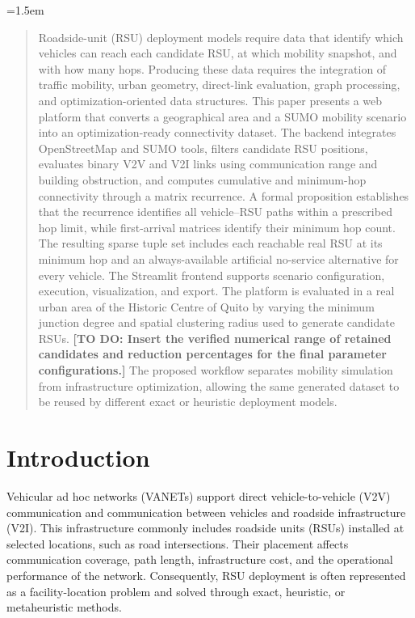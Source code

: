 \documentclass[engproc,proceedingpaper,submit,oneauthor]{Definitions/mdpi}
\newcommand{\added}[1]{{\color{revisionblue}#1}}
\newcommand{\todo}[1]{{\color{todored}\textbf{[TO DO: #1]}}}
\begin{document}
\emergencystretch=1.5em
\maketitle

\begin{abstract}
Roadside-unit (RSU) deployment models require data that identify which vehicles can reach each candidate RSU, at which mobility snapshot, and with how many hops. Producing these data requires the integration of traffic mobility, urban geometry, direct-link evaluation, graph processing, and optimization-oriented data structures. This paper presents a web platform that converts a geographical area and a SUMO mobility scenario into an optimization-ready connectivity dataset. The backend integrates OpenStreetMap and SUMO tools, filters candidate RSU positions, evaluates binary V2V and V2I links using communication range and building obstruction, and computes cumulative and minimum-hop connectivity through a matrix recurrence. \added{A formal proposition establishes that the recurrence identifies all vehicle--RSU paths within a prescribed hop limit, while first-arrival matrices identify their minimum hop count. The resulting sparse tuple set includes each reachable real RSU at its minimum hop and an always-available artificial no-service alternative for every vehicle.} The Streamlit frontend supports scenario configuration, execution, visualization, and export. The platform is evaluated in a real urban area of the Historic Centre of Quito by varying the minimum junction degree and spatial clustering radius used to generate candidate RSUs. \todo{Insert the verified numerical range of retained candidates and reduction percentages for the final parameter configurations.} The proposed workflow separates mobility simulation from infrastructure optimization, allowing the same generated dataset to be reused by different exact or heuristic deployment models.
\end{abstract}


\section{Introduction}
Vehicular ad hoc networks (VANETs) support direct vehicle-to-vehicle (V2V) communication and communication between vehicles and roadside infrastructure (V2I). This infrastructure commonly includes roadside units (RSUs) installed at selected locations, such as road intersections. Their placement affects communication coverage, path length, infrastructure cost, and the operational performance of the network. Consequently, RSU deployment is often represented as a facility-location problem and solved through exact, heuristic, or metaheuristic methods.
\end{document}
